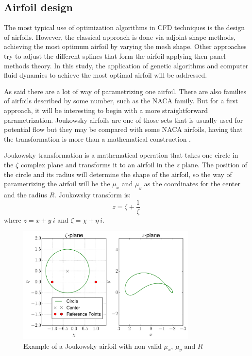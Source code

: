 \vspace{2mm}

\newpage

\subsection{Airfoil design}


The most typical use of optimization algorithms in CFD techniques is the design of airfoils. However, the classical approach is done via adjoint shape methods, achieving the most optimum airfoil by varying the mesh shape. Other approaches try to adjust the different splines that form the airfoil applying then panel methods theory. In this study, the application of genetic algorithms and computer fluid dynamics to achieve the most optimal airfoil will be addressed. 

As said there are a lot of way of parametrizing one airfoil. There are also families of airfoils described by some number, such as the NACA family. But for a first approach, it will be interesting to begin with a more straightforward parametrization. Joukowsky airfoils are one of those sets that is usually used for potential flow but they may be compared with some NACA airfoils, having that the transformation is more than a mathematical construction \cite{kapania2008modeling}.

Joukowsky transformation is a mathematical operation that takes one circle in the $\zeta$ complex plane and transforms it to an airfoil in the $z$ plane. The position of the circle and its radius will determine the shape of the airfoil, so the way of parametrizing the airfoil will be the $\mu_x$ and $\mu_y$ as the coordinates for the center and the radius $R$. Joukowsky transform is:
\begin{equation}
z=\zeta+\dfrac{1}{\zeta}
\end{equation}
where $z = x + y\ i$ and $\zeta = \chi + \eta\ i$. 

     \begin{figure}[h!]
        \centering
        \includegraphics[width=0.8\textwidth]{Figures/3/nonJouk2.pdf}
        \caption{Example of a Joukowsky airfoil with non valid $\mu_x$, $\mu_y$ and $R$}
        \label{fig:nonJoukowsky}
    \end{figure}

